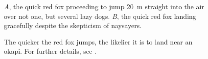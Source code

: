 \documentclass[11pt]{article}
\begin{document}
\begin{figure}[h!]
\caption{\textit{A}, the quick red fox proceeding to jump 20~m straight into the air over not one, but several lazy dogs. \textit{B}, the quick red fox landing gracefully despite the skepticism of naysayers.}
\label{Fig:Jumps}
\end{figure}

\begin{figure}[h!]
\caption{The quicker the red fox jumps, the likelier it is to land near an okapi. For further details, see \citet{LemKapEx07}.}
\label{Fig:JumpsOk}
\end{figure}

\renewcommand{\thefigure}{B\arabic{figure}}
\setcounter{figure}{0}
\end{document}
